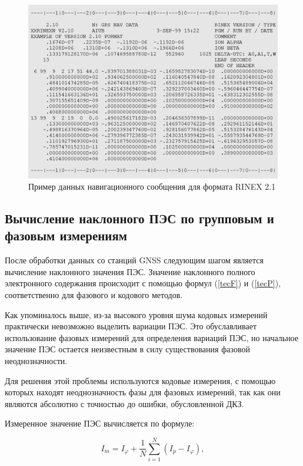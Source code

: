 \documentclass[a4paper]{article}
\begin{document}
\begin{figure}[h!]
\centering
\includegraphics[width = 1\linewidth]{pics/rinex_nav.png}
\caption{Пример данных навигационного сообщения для формата RINEX 2.1}
\end{figure}


\clearpage
\newpage

\subsection{Вычисление наклонного ПЭС по групповым и фазовым измерениям}
После обработки данных со станций GNSS следующим шагом является вычисление наклонного значения ПЭС. Значение наклонного полного электронного содержания происходит с помощью формул (\ref{tecF}) и (\ref{tecP}), соответственно для фазового и кодового методов. 

Как упоминалось выше, из-за высокого уровня шума кодовых измерений практически невозможно выделить вариации ПЭС. Это обуславливает использование фазовых измерений для определения вариаций ПЭС, но начальное значение ПЭС остается неизвестным в силу существования фазовой неоднозначности.

Для решения этой проблемы используются кодовые измерения, с помощью которых находят неоднозначность фазы для фазовых измерений, так как они являются абсолютно с точностью до ошибки, обусловленной ДКЗ.

Измеренное значение ПЭС вычисляется по формуле:

\begin{equation}
I_{m} = I_{\varphi} + \frac{1}{N}\sum_{i=1}^N (I_p - I_{\varphi}),
\end{equation}
\end{document}
